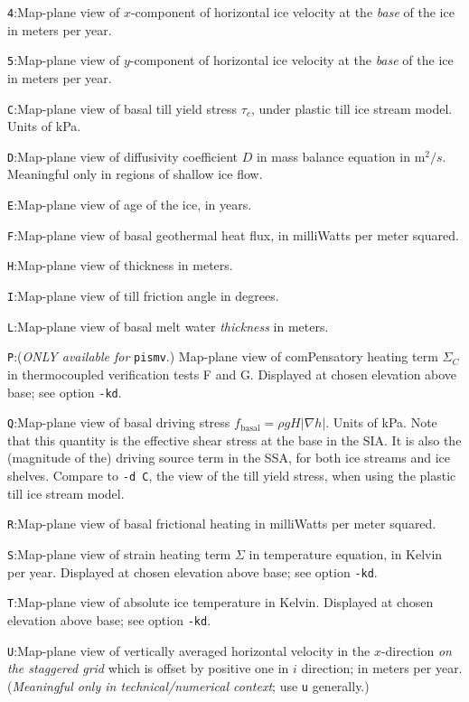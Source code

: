 \documentclass[11pt,final]{amsart}
\renewcommand{\t}[1]{\texttt{#1}}
\newcommand{\grad}{\nabla}
\begin{document}
\verb|4|:\quad Map-plane view of $x$-component of horizontal ice velocity at the \emph{base} of the ice in meters per year.

\verb|5|:\quad Map-plane view of $y$-component of horizontal ice velocity at the \emph{base} of the ice in meters per year.

\verb|C|:\quad Map-plane view of basal till yield stress $\tau_c$, under plastic till ice stream model.  Units of kPa.

\verb|D|:\quad \notMat Map-plane view of diffusivity coefficient $D$ in mass balance equation in $\text{m}^2/s$.  Meaningful only in regions of shallow ice flow.

\verb|E|:\quad Map-plane view of age of the ice, in years.

\verb|F|:\quad Map-plane view of basal geothermal heat flux, in milliWatts per meter squared.

\verb|H|:\quad Map-plane view of thickness in meters.

\verb|I|:\quad Map-plane view of till friction angle in degrees.

\verb|L|:\quad Map-plane view of basal melt water \emph{thickness} in meters.

\verb|P|:\quad \notMat (\emph{ONLY available for }\t{pismv}.)  Map-plane view of comPensatory heating term $\Sigma_C$ in thermocoupled verification tests F and G.  Displayed at chosen elevation above base; see option \verb|-kd|.

\verb|Q|:\quad Map-plane view of basal driving stress $f_{\text{basal}} = \rho g H |\grad h|$.  Units of kPa.  Note that this quantity is the effective shear stress at the base in the SIA.  It is also the (magnitude of the) driving source term in the SSA, for both ice streams and ice shelves.  Compare to \verb|-d C|, the view of the till yield stress, when using the plastic till ice stream model.

\verb|R|:\quad Map-plane view of basal frictional heating in milliWatts per meter squared.

\verb|S|:\quad Map-plane view of strain heating term $\Sigma$ in temperature equation, in Kelvin per year.  Displayed at chosen elevation above base; see option \verb|-kd|.

\verb|T|:\quad Map-plane view of absolute ice temperature in Kelvin.  Displayed at chosen elevation above base; see option \verb|-kd|.

\verb|U|:\quad Map-plane view of vertically averaged horizontal velocity in the $x$-direction \emph{on the staggered grid} which is offset by positive one in $i$ direction;  in meters per year.  (\emph{Meaningful only in technical/numerical context}; use \verb|u| generally.)
\end{document}
